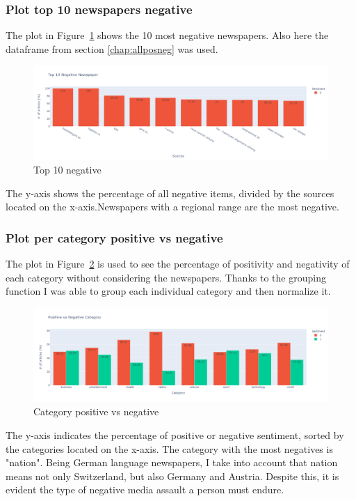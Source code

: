 \subsubsection{Plot top 10 newspapers negative}
The \gls{plot} in Figure~\ref{fig:fig_10neg} shows the 10 most negative newspapers. Also here the dataframe from section \ref{chap:allposneg} was used.
\begin{figure}[H]
 \includegraphics[width=1.25\textwidth,center]{images/topneg.png}
\caption{Top 10 negative}
\label{fig:fig_10neg}
\end{figure}
\FloatBarrier
The y-axis shows the percentage of all negative items, divided by the sources located on the x-axis.Newspapers with a regional range are the most negative.

\subsubsection{Plot per category positive vs negative}
The \gls{plot} in Figure~\ref{fig:fig_catposneg} is used to see the percentage of positivity and negativity of each category without considering the newspapers. Thanks to the grouping function I was able to group each individual category and then normalize it.

\begin{figure}[H]
 \includegraphics[width=1.25\textwidth,center]{images/cattot.png}
\caption{Category positive vs negative}
\label{fig:fig_catposneg}
\end{figure}
\FloatBarrier
The y-axis indicates the percentage of positive or negative sentiment, sorted by the categories located on the x-axis.
The category with the most negatives is "nation". Being German language newspapers, I take into account that nation means not only Switzerland, but also Germany and Austria.
Despite this, it is evident the type of negative media assault a person must endure.

